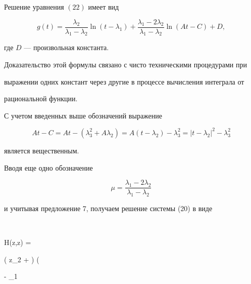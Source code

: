 \begin{prop}


Решение уравнения $(22)$ имеет вид


$$ 


 g(t) =


\frac{\lambda_2}{\lambda_1 - \lambda_2} 


\ln( t - \lambda_1 )+


\frac{\lambda_1 - 2 \lambda_2}{\lambda_1 - \lambda_2} 


\ln( At - C ) + D, 


$$


где $ D $ --- произвольная константа.


\end{prop}





Доказательство этой формулы связано с чисто техническими процедурами при 


выражении одних констант через другие в процессе вычисления интеграла от 


рациональной функции.





\begin{notenonum}


С учетом введенных выше обозначений выражение


$$ At - C = At - ( \lambda_3^2 + A \lambda_2 ) = A ( t- \lambda_2) - 


 \lambda_3^2 = 


| t - \lambda_2 |^2 - \lambda_3^2


$$


является вещественным.


\end{notenonum}





Вводя еще одно обозначение 


$$ 


\mu = \frac{\lambda_1 - 2 \lambda_2}{\lambda_1 - \lambda_2} 


$$


и учитывая предложение 7, получаем решение системы (20) в виде


$$


 H(z,\overline z) = 


( z_2 + \alpha ) \bigg( 


 - \lambda_1 


